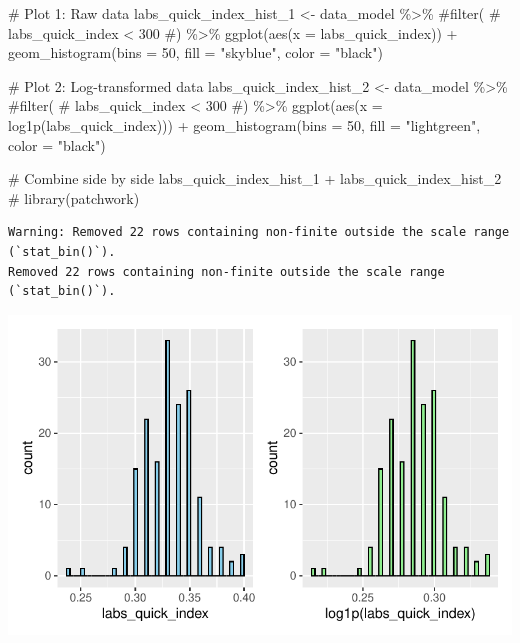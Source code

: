 \documentclass[
  letterpaper,
  DIV=11,
  numbers=noendperiod]{scrartcl}
\newenvironment{Shaded}{\begin{snugshade}}{\end{snugshade}}
\newcommand{\AttributeTok}[1]{\textcolor[rgb]{0.40,0.45,0.13}{#1}}
\newcommand{\CommentTok}[1]{\textcolor[rgb]{0.37,0.37,0.37}{#1}}
\newcommand{\DecValTok}[1]{\textcolor[rgb]{0.68,0.00,0.00}{#1}}
\newcommand{\FunctionTok}[1]{\textcolor[rgb]{0.28,0.35,0.67}{#1}}
\newcommand{\NormalTok}[1]{\textcolor[rgb]{0.00,0.23,0.31}{#1}}
\newcommand{\OtherTok}[1]{\textcolor[rgb]{0.00,0.23,0.31}{#1}}
\newcommand{\SpecialCharTok}[1]{\textcolor[rgb]{0.37,0.37,0.37}{#1}}
\newcommand{\StringTok}[1]{\textcolor[rgb]{0.13,0.47,0.30}{#1}}
\begin{document}
\begin{Shaded}
\begin{Highlighting}[]
\CommentTok{\# Plot 1: Raw data}
\NormalTok{labs\_quick\_index\_hist\_1 }\OtherTok{\textless{}{-}}\NormalTok{ data\_model }\SpecialCharTok{\%\textgreater{}\%} 
    \CommentTok{\#filter(}
    \CommentTok{\#    labs\_quick\_index \textless{} 300}
    \CommentTok{\#) \%\textgreater{}\% }
    \FunctionTok{ggplot}\NormalTok{(}\FunctionTok{aes}\NormalTok{(}\AttributeTok{x =}\NormalTok{ labs\_quick\_index)) }\SpecialCharTok{+} 
    \FunctionTok{geom\_histogram}\NormalTok{(}\AttributeTok{bins =} \DecValTok{50}\NormalTok{, }\AttributeTok{fill =} \StringTok{"skyblue"}\NormalTok{, }\AttributeTok{color =} \StringTok{"black"}\NormalTok{)}

\CommentTok{\# Plot 2: Log{-}transformed data}
\NormalTok{labs\_quick\_index\_hist\_2 }\OtherTok{\textless{}{-}}\NormalTok{ data\_model }\SpecialCharTok{\%\textgreater{}\%} 
    \CommentTok{\#filter(}
    \CommentTok{\#    labs\_quick\_index \textless{} 300}
    \CommentTok{\#) \%\textgreater{}\%}
    \FunctionTok{ggplot}\NormalTok{(}\FunctionTok{aes}\NormalTok{(}\AttributeTok{x =} \FunctionTok{log1p}\NormalTok{(labs\_quick\_index))) }\SpecialCharTok{+} 
    \FunctionTok{geom\_histogram}\NormalTok{(}\AttributeTok{bins =} \DecValTok{50}\NormalTok{, }\AttributeTok{fill =} \StringTok{"lightgreen"}\NormalTok{, }\AttributeTok{color =} \StringTok{"black"}\NormalTok{)}

\CommentTok{\# Combine side by side}
\NormalTok{labs\_quick\_index\_hist\_1 }\SpecialCharTok{+}\NormalTok{ labs\_quick\_index\_hist\_2 }\CommentTok{\# library(patchwork)}
\end{Highlighting}
\end{Shaded}

\begin{verbatim}
Warning: Removed 22 rows containing non-finite outside the scale range (`stat_bin()`).
Removed 22 rows containing non-finite outside the scale range (`stat_bin()`).
\end{verbatim}

\includegraphics{Outcomes_V1V2V3_files/figure-pdf/labs_quick_index_1-1.pdf}
\end{document}
